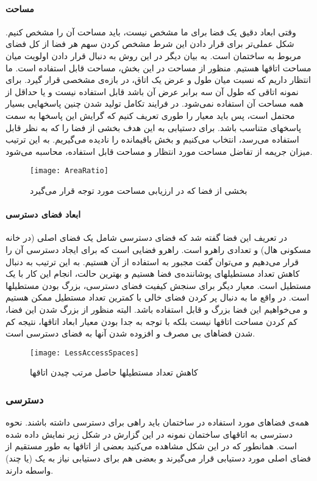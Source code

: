 \documentclass{report}
\begin{document}
\paragraph{مساحت}
وقتی ابعاد دقیق یک فضا برای ما مشخص نیست، باید مساحت آن را مشخص کنیم. شکل عملی‌تر برای قرار دادن این شرط مشخص کردن سهم هر فضا از کل فضای مربوط به ساختمان است. به بیان دیگر در این روش به دنبال قرار دادن اولویت میان مساحت اتاقها هستیم.
منظور از مساحت در این بخش، مساحت قابل استفاده است. ما انتظار داریم که نسبت میان طول و عرض یک اتاق، در بازه‌ی مشخصی قرار گیرد. برای نمونه اتاقی که طول آن سه برابر عرض آن باشد قابل استفاده نیست و یا حداقل از همه مساحت آن استفاده نمی‌شود. در فرایند تکامل تولید شدن چنین پاسخهایی بسیار محتمل است، پس باید معیار را طوری تعریف کنیم که گرایش این پاسخها به سمت پاسخهای متناسب باشد. برای دستیابی به این هدف بخشی از فضا را که به نظر قابل استفاده می‌رسد، انتخاب می‌کنیم و بخش باقیمانده را نادیده می‌گیریم. به این ترتیب میزان جریمه از تفاضل مساحت مورد انتظار و مساحت قابل استفاده، محاسبه می‌شود.

\begin{figure}[h] \centerline{\texttt{[image: AreaRatio]}} \caption{\label{fAreaRatio}
بخشی از فضا که در ارزیابی مساحت مورد توجه قرار می‌گیرد
 } \end{figure}

\paragraph{ابعاد فضای دسترسی}
در تعریف این فضا گفته شد که فضای دسترسی شامل یک فضای اصلی (در خانه مسکونی هال) و تعدادی راهرو است. راهرو فضایی است که برای ایجاد دسترسی آن را قرار می‌دهیم و می‌توان گفت مجبور به استفاده از آن هستیم. به این ترتیب به دنبال کاهش تعداد مستطیلهای پوشاننده‌ی فضا هستیم و بهترین حالت، انجام این کار با یک مستطیل است. معیار دیگر برای سنجش کیفیت فضای دسترسی، بزرگ بودن مستطیلها است.
در واقع ما به دنبال پر کردن فضای خالی با کمترین تعداد مستطیل ممکن هستیم و می‌خواهیم این فضا بزرگ و قابل استفاده باشد. البته منظور از بزرگ شدن این فضا، کم کردن مساحت اتاقها نیست بلکه با توجه به جدا بودن معیار ابعاد اتاقها، نتیجه کم شدن فضاهای بی مصرف و افزوده شدن آنها به فضای دسترسی است.

\begin{figure}[h] \centerline{\texttt{[image: LessAccessSpaces]}} \caption{\label{fLessAccessSpaces}
کاهش تعداد مستطیلها حاصل مرتب چیدن اتاقها
 } \end{figure}

\subsubsection{دسترسی}
همه‌ی فضاهای مورد استفاده در ساختمان باید راهی برای دسترسی داشته باشند. نحوه دسترسی به اتاقهای ساختمان نمونه در این گزارش در شکل زیر نمایش داده شده است. همانطور که در این شکل مشاهده می‌کنید بعضی از اتاقها به طور مستقیم از فضای اصلی مورد دستیابی قرار می‌گیرند و بعضی هم برای دستیابی نیاز به یک (یا چند) واسطه دارند.
\end{document}

